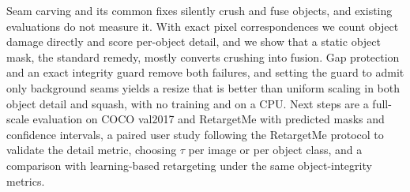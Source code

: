 \documentclass[conference]{IEEEtran}
\begin{document}
Seam carving and its common fixes silently crush and fuse objects, and existing evaluations do not measure it. With exact pixel correspondences we count object damage directly and score per-object detail, and we show that a static object mask, the standard remedy, mostly converts crushing into fusion. Gap protection and an exact integrity guard remove both failures, and setting the guard to admit only background seams yields a resize that is better than uniform scaling in both object detail and squash, with no training and on a CPU. Next steps are a full-scale evaluation on COCO val2017 and RetargetMe with predicted masks and confidence intervals, a paired user study following the RetargetMe protocol to validate the detail metric, choosing $\tau$ per image or per object class, and a comparison with learning-based retargeting under the same object-integrity metrics.



\end{document}
